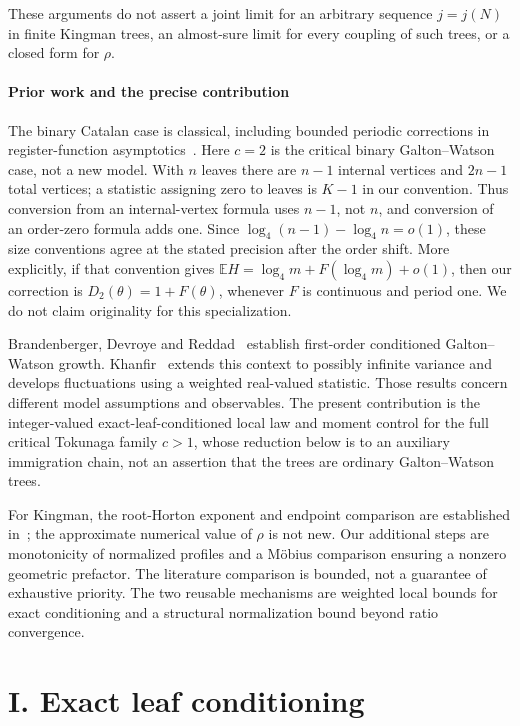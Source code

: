 \documentclass[11pt,a4paper]{article}
\theoremstyle{remark}\newtheorem{remark}[theorem]{Remark}
\newcommand{\E}{\mathbb E}\newcommand{\Pp}{\mathbb P}
\begin{document}
These arguments do not assert a joint limit for an arbitrary sequence $j=j(N)$ in finite Kingman trees, an almost-sure limit for every coupling of such trees, or a closed form for $\rho$.

\subsection{Prior work and the precise contribution}
The binary Catalan case is classical, including bounded periodic corrections in register-function asymptotics~\cite{FRV1979}. Here $c=2$ is the critical binary Galton--Watson case, not a new model. With $n$ leaves there are $n-1$ internal vertices and $2n-1$ total vertices; a statistic assigning zero to leaves is $K-1$ in our convention. Thus conversion from an internal-vertex formula uses $n-1$, not $n$, and conversion of an order-zero formula adds one. Since $\log_4(n-1)-\log_4 n=o(1)$, these size conventions agree at the stated precision after the order shift. More explicitly, if that convention gives $\E H=\log_4 m+F(\log_4 m)+o(1)$, then our correction is $D_2(\theta)=1+F(\theta)$, whenever $F$ is continuous and period one. We do not claim originality for this specialization.

Brandenberger, Devroye and Reddad~\cite{BDR2021} establish first-order conditioned Galton--Watson growth. Khanfir~\cite{Khanfir2025,KhanfirFluct} extends this context to possibly infinite variance and develops fluctuations using a weighted real-valued statistic. Those results concern different model assumptions and observables. The present contribution is the integer-valued exact-leaf-conditioned local law and moment control for the full critical Tokunaga family $c>1$, whose reduction below is to an auxiliary immigration chain, not an assertion that the trees are ordinary Galton--Watson trees.

For Kingman, the root-Horton exponent and endpoint comparison are established in~\cite{KZ2017}; the approximate numerical value of $\rho$ is not new. Our additional steps are monotonicity of normalized profiles and a M\"obius comparison ensuring a nonzero geometric prefactor. The literature comparison is bounded, not a guarantee of exhaustive priority. The two reusable mechanisms are weighted local bounds for exact conditioning and a structural normalization bound beyond ratio convergence.

\part*{I. Exact leaf conditioning}
\end{document}
